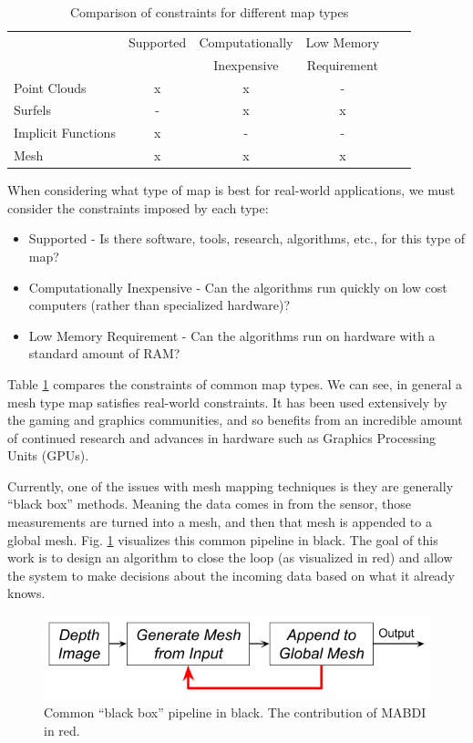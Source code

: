\begin{table}[h]
\begin{footnotesize}
\begin{center}
\begin{tabular}{|l|c|c|c|c|c|}
\hline
\multirow{2}{*}{} & Supported & Computationally & Low Memory \\
 & & Inexpensive & Requirement \\\hline
Point Clouds		& x & x & - \\
Surfels             	& - & x & x \\
Implicit Functions 	& x & - & - \\
Mesh	 	& x & x & x \\
\hline
\end{tabular}
\end{center}
\end{footnotesize}
\caption{Comparison of constraints for different map types}
\label{tab:rep}
\end{table}

When considering what type of map is best for real-world applications, we must consider the constraints imposed by each type:

\begin{itemize}
  \item Supported - Is there software, tools, research, algorithms, etc., for
  this type of map?
  \item Computationally Inexpensive - Can the algorithms run quickly on low cost
  computers (rather than specialized hardware)?
  \item Low Memory Requirement - Can the algorithms run on hardware with
  a standard amount of RAM?
\end{itemize}

Table \ref{tab:rep} compares the constraints of common map types. We can see, in
general a mesh type map satisfies real-world constraints. It has been used
extensively by the gaming and graphics communities, and so benefits from an
incredible amount of continued research and advances in hardware such as
Graphics Processing Units (GPUs).

Currently, one of the issues with mesh mapping techniques is they are generally
``black box'' methods. Meaning the data comes in from the sensor, those
measurements are turned into a mesh, and then that mesh is appended to a global
mesh. Fig. \ref{fig:pipeline} visualizes this common pipeline in black. The goal
of this work is to design an algorithm to close the loop (as visualized in red)
and allow the system to make decisions about the incoming data based on what it
already knows.

\begin{figure}[h]%
\centering
\includegraphics[width=.5\textwidth]{figures/diagram_general_pipeline.png}
\caption{Common ``black box'' pipeline in black. The contribution of MABDI in red.}
\label{fig:pipeline}
\end{figure}
